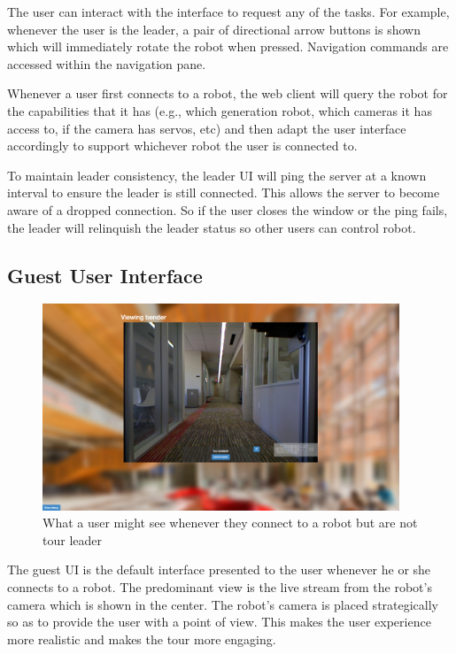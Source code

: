 \documentclass[
  oneside,
  11pt, a4paper,
  footinclude=true,
  headinclude=true,
  cleardoublepage=empty
]{article}
\begin{document}
The user can interact with the interface to request any of the tasks. For
example, whenever the user is the leader, a pair of directional arrow buttons
is shown which will immediately rotate the robot when pressed. Navigation
commands are accessed within the navigation pane.

Whenever a user first connects to a robot, the web client will query the robot
for the capabilities that it has (e.g., which generation robot, which cameras it
has access to, if the camera has servos, etc) and then adapt the user
interface accordingly to support whichever robot the user is connected to.

To maintain leader consistency, the leader UI will ping the server at
a known interval to ensure the leader is still connected. This allows the
server to become aware of a dropped connection. So if the user closes the window
or the ping fails, the leader will relinquish the leader status so other users
can control robot.


\subsection{Guest User Interface}

\begin{figure}
  \centering
  \includegraphics[width=0.95\textwidth]{guestUI}
  \caption{What a user might see whenever they connect to a robot but are not
  tour leader}
  \label{fig:guest_mode}
\end{figure}

The guest UI is the default interface presented to the user whenever he or she
connects to a robot. The predominant view is the live stream from the robot's
camera which is shown in the center. The robot's camera is placed strategically
so as to provide the user with a point of view. This makes the user experience
more realistic and makes the tour more engaging.
\end{document}
